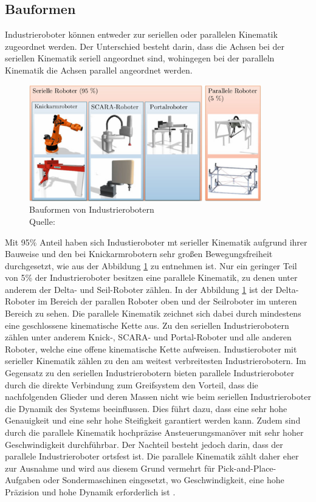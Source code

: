 \subsection{Bauformen}
Industrieroboter können entweder zur seriellen oder parallelen Kinematik zugeordnet werden. Der Unterschied besteht darin, dass die Achsen bei der seriellen Kinematik seriell angeordnet sind, wohingegen bei der paralleln Kinematik die Achsen parallel angeordnet werden.

\begin{figure}[htb]
	\centering
	\includegraphics[width=0.9\textwidth]{images/stand_der_technik/bauformen_industrieroboter}
	\caption[Bauformen von Industrierobotern]{Bauformen von Industrierobotern \\Quelle: \cite[18]{pott_industrielle_2019}}
	\label{fig:bauformen_industrieroboter}
\end{figure}
\FloatBarrier

Mit 95\% Anteil haben sich Industieroboter mt serieller Kinematik aufgrund ihrer Bauweise und den bei Knickarmrobotern sehr großen Bewegungsfreiheit durchgesetzt, wie aus der Abbildung \ref{fig:bauformen_industrieroboter} zu entnehmen ist. Nur ein geringer Teil von 5\% der Industrieroboter besitzen eine parallele Kinematik, zu denen unter anderem der Delta- und Seil-Roboter zählen. In der Abbildung \ref{fig:bauformen_industrieroboter} ist der Delta-Roboter im Bereich der parallen Roboter oben und der Seilroboter im unteren Bereich zu sehen. Die parallele Kinematik zeichnet sich dabei durch mindestens eine geschlossene kinematische Kette aus. Zu den seriellen Industrierobotern zählen unter anderem Knick-, SCARA- und Portal-Roboter und alle anderen Roboter, welche eine offene kinematische Kette aufweisen. Industieroboter mit serieller Kinematik zählen zu den am weitest verbreitesten Industrierobotern. Im Gegensatz zu den seriellen Industrierobotern bieten parallele Industrieroboter durch die direkte Verbindung zum Greifsystem den Vorteil, dass die nachfolgenden Glieder und deren Massen nicht wie beim seriellen Industrieroboter die Dynamik des Systems beeinflussen. Dies führt dazu, dass eine sehr hohe Genauigkeit und eine sehr hohe Steifigkeit garantiert werden kann. Zudem sind durch die parallele Kinematik hochpräzise Ansteuerungsmanöver mit sehr hoher Geschwindigkeit durchführbar. Der Nachteil besteht jedoch darin, dass der parallele Industrieroboter ortsfest ist. Die parallele Kinematik zählt daher eher zur Ausnahme und wird aus diesem Grund vermehrt für Pick-and-Place-Aufgaben oder Sondermaschinen eingesetzt, wo Geschwindigkeit, eine hohe Präzision und hohe Dynamik erforderlich ist \cite[17\psqq]{pott_industrielle_2019}.\\

